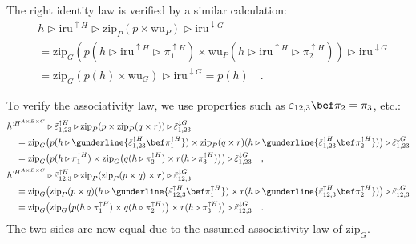 The right identity law is verified by a similar calculation:
\begin{align*}
 & h\triangleright\text{iru}^{\uparrow H}\triangleright\text{zip}_{P}(p\times\text{wu}_{P})\triangleright\text{iru}^{\downarrow G}\\
 & =\text{zip}_{G}(p(h\triangleright\text{iru}^{\uparrow H}\triangleright\pi_{1}^{\uparrow H})\times\text{wu}_{P}(h\triangleright\text{iru}^{\uparrow H}\triangleright\pi_{2}^{\uparrow H}))\triangleright\text{iru}^{\downarrow G}\\
 & =\text{zip}_{G}(p(h)\times\text{wu}_{G})\triangleright\text{iru}^{\downarrow G}=p(h)\quad.
\end{align*}

To verify the associativity law, we use properties such as $\varepsilon_{12,3}\bef\pi_{2}=\pi_{3}$,
etc.:
\begin{align*}
 & h^{:H^{A\times B\times C}}\triangleright\tilde{\varepsilon}_{1,23}^{\uparrow H}\triangleright\text{zip}_{P}(p\times\text{zip}_{P}(q\times r))\triangleright\tilde{\varepsilon}_{1,23}^{\downarrow G}\\
 & \quad=\text{zip}_{G}\big(p(h\triangleright\gunderline{\tilde{\varepsilon}_{1,23}^{\uparrow H}\bef\pi_{1}^{\uparrow H}})\times\text{zip}_{P}(q\times r)(h\triangleright\gunderline{\tilde{\varepsilon}_{1,23}^{\uparrow H}\bef\pi_{2}^{\uparrow H}})\big)\triangleright\tilde{\varepsilon}_{1,23}^{\downarrow G}\\
 & \quad=\text{zip}_{G}\big(p(h\triangleright\pi_{1}^{\uparrow H})\times\text{zip}_{G}\big(q(h\triangleright\pi_{2}^{\uparrow H})\times r(h\triangleright\pi_{3}^{\uparrow H})\big)\big)\triangleright\tilde{\varepsilon}_{1,23}^{\downarrow G}\quad,\\
 & h^{:H^{A\times B\times C}}\triangleright\tilde{\varepsilon}_{12,3}^{\uparrow H}\triangleright\text{zip}_{P}(\text{zip}_{P}(p\times q)\times r)\triangleright\tilde{\varepsilon}_{12,3}^{\downarrow G}\\
 & \quad=\text{zip}_{G}\big(\text{zip}_{P}(p\times q)(h\triangleright\gunderline{\tilde{\varepsilon}_{12,3}^{\uparrow H}\bef\pi_{1}^{\uparrow H}})\times r(h\triangleright\gunderline{\tilde{\varepsilon}_{12,3}^{\uparrow H}\bef\pi_{2}^{\uparrow H}})\big)\triangleright\tilde{\varepsilon}_{12,3}^{\downarrow G}\\
 & \quad=\text{zip}_{G}\big(\text{zip}_{G}\big(p(h\triangleright\pi_{1}^{\uparrow H})\times q(h\triangleright\pi_{2}^{\uparrow H})\big)\times r(h\triangleright\pi_{3}^{\uparrow H})\big)\triangleright\tilde{\varepsilon}_{12,3}^{\downarrow G}\quad.
\end{align*}
The two sides are now equal due to the assumed associativity law of
$\text{zip}_{G}$.

